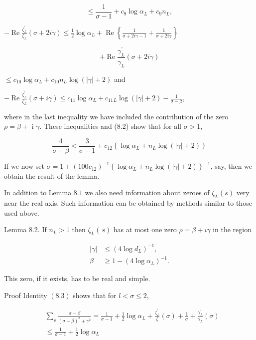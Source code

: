 $$
\leqslant \frac{1}{\sigma-1}+c_{9} \log \alpha_{L}+c_{9} n_{L},
$$

$-\operatorname{Re} \frac{\zeta_{L}^{\prime}}{\zeta_{L}}(\sigma+2 i \gamma) \leqslant \frac{1}{2} \log \alpha_{L}+\operatorname{Re}\left\{\frac{1}{\sigma+2 i \gamma-1}+\frac{1}{\sigma+2 i \gamma}\right\}$

$$
+\operatorname{Re} \frac{\gamma_{L}^{\prime}}{\gamma_{L}}(\sigma+2 i \gamma)
$$

$\leqslant c_{10} \log \alpha_{L}+c_{10} n_{L} \log (|\gamma|+2)$ and

$-\operatorname{Re} \frac{\zeta_{L}^{\prime}}{\zeta_{L}}(\sigma+i \gamma) \leqslant c_{11} \log \alpha_{L}+c_{11}{ }_{L} \log (|\gamma|+2)-\frac{1}{\sigma-\beta}$,

where in the last inequality we have included the contribution of the zero $\rho=\beta+$ i $\gamma$. These inequalities and (8.2) show that for all $\sigma>1$,

$$
\frac{4}{\sigma-\beta}<\frac{3}{\sigma-1}+c_{12}\left\{\log \alpha_{L}+n_{L} \log (|\gamma|+2)\right\}
$$

If we now set $\sigma=1+\left(100 c_{12}\right)^{-1}\left\{\log \alpha_{L}+n_{L} \log (|\gamma|+2)\right\}^{-1}$, say, then we obtain the result of the lemma.

In addition to Lemma $8.1$ we also need information about zeroes of $\zeta_{L}(s)$ very near the real axis. Such information can be obtained by methods similar to those used above.

Lemma 8.2. If $n_{L}>1$ then $\zeta_{L}(\mathrm{~s})$ has at most one zero $\rho=\beta+i \gamma$ in the region

$$
\begin{aligned}
|\gamma| & \leqslant\left(4 \log d_{L}\right)^{-1}, \\
\beta & \geqslant 1-\left(4 \log \alpha_{L}\right)^{-1} .
\end{aligned}
$$

This zero, if it exists, has to be real and simple.

Proof Identity $(8.3)$ shows that for $l<\sigma \leqslant 2$, 

$$
\begin{aligned}
& \sum_{\rho} \frac{\sigma-\beta}{(\sigma-\beta)^{2}+\gamma^{2}}=\frac{1}{\sigma-1}+\frac{1}{2} \log \alpha_{L}+\frac{\zeta_{L}^{\prime}}{\zeta}(\sigma)+\frac{1}{\sigma}+\frac{\gamma_{L}^{\prime}}{\gamma_{L}}(\sigma) \\
& \leqslant \frac{1}{\sigma-1}+\frac{1}{2} \log \alpha_{L}
\end{aligned}
$$

